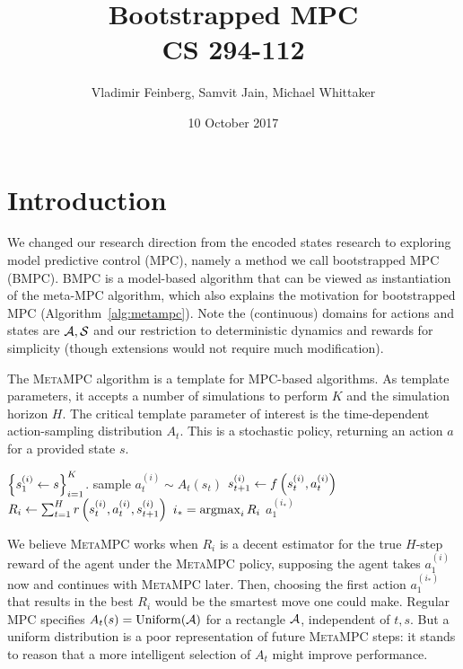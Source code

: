 \documentclass{article}
\title{Bootstrapped MPC\\\large CS 294-112}
\author{Vladimir Feinberg, Samvit Jain, Michael Whittaker}
\date{10 October 2017}
\begin{document}
	
\maketitle

\section{Introduction}

We changed our research direction from the encoded states research to exploring model predictive control (MPC), namely a method we call bootstrapped MPC (BMPC). BMPC is a model-based algorithm that can be viewed as instantiation of the meta-MPC algorithm, which also explains the motivation for bootstrapped MPC (Algorithm~\ref{alg:metampc}). Note the (continuous) domains for actions and states are $\mathcal{A}, \mathcal{S}$ and our restriction to deterministic dynamics and rewards for simplicity (though extensions would not require much modification).

\begin{algorithm}
\caption{The \textsc{MetaMPC} algorithm is a template for MPC-based algorithms. As template parameters, it accepts a number of simulations to perform $K$ and the simulation horizon $H$. The critical template parameter of interest is the time-dependent action-sampling distribution $A_t$. This is a stochastic policy, returning an action $a$ for a provided state $s$.}\label{alg:metampc}
\begin{algorithmic}[1]
\State $\left\{{s_1^{(i)}\gets s}\right\}_{i=1}^K$.
\State sample $a_t^{(i)}\sim A_t(s_t)$
\State $s_{t+1}^{(i)}\gets f\left({s_t^{(i)},a_t^{(i)}}\right)$
\EndFor
\State $R_i\gets\sum_{t=1}^{H}r\left({s_{t}^{(i)},a_t^{(i)},s_{t+1}^{(i)}}\right)$
\EndFor
\State $i_*=\operatorname*{argmax}_i R_i$
\State \Return $a_1^{(i_*)}$
\EndProcedure
\end{algorithmic}
\end{algorithm}

We believe \textsc{MetaMPC} works when $R_i$ is a decent estimator for the true $H$-step reward of the agent under the \textsc{MetaMPC} policy, supposing the agent takes $a_1^{(i)}$ now and continues with \textsc{MetaMPC} later. Then, choosing the first action $a_1^{(i_*)}$ that results in the best $R_i$ would be the smartest move one could make. Regular MPC specifies $A_t(s)=\operatorname{Uniform}(\mathcal{A})$ for a rectangle $\mathcal{A}$, independent of $t,s$. But a uniform distribution is a poor representation of future \textsc{MetaMPC} steps: it stands to reason that a more intelligent selection of $A_t$ might improve performance.
\end{document}
